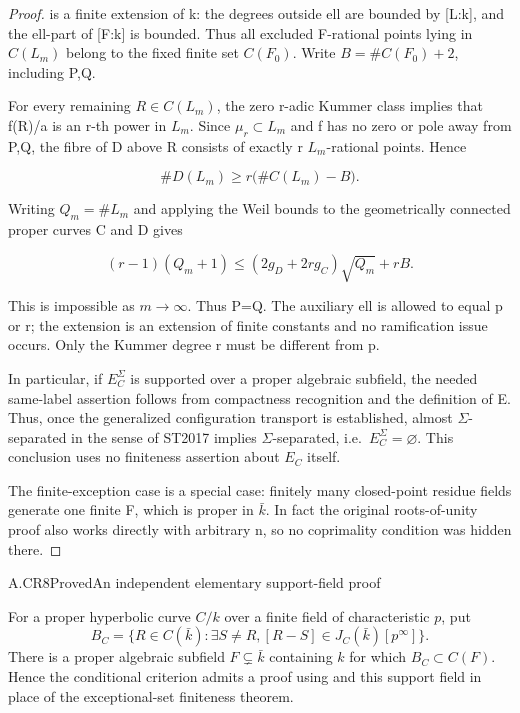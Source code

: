 \begin{proof}
is a finite extension of k: the degrees outside ell are bounded by {[}L:k{]}, and the ell-part of {[}F:k{]} is bounded. Thus all excluded F-rational points lying in \(C(L_m)\) belong to the fixed finite set \(C(F_0)\). Write \(B=\#C(F_0)+2\), including P,Q.

For every remaining \(R{\in}C(L_m)\), the zero r-adic Kummer class implies that f(R)/a is an r-th power in \(L_m\). Since \({\mu}_r{\subset}L_m\) and f has no zero or pole away from P,Q, the fibre of D above R consists of exactly r \(L_m\)-rational points. Hence

\[\#D(L_m)\ge r\bigl(\#C(L_m)-B\bigr).\]

Writing \(Q_m=\#L_m\) and applying the Weil bounds to the geometrically connected proper curves C and D gives

\[(r-1)(Q_m+1)\le (2g_D+2r g_C)\sqrt{Q_m}+rB.\]

This is impossible as \(m{\to}{\infty}\). Thus P=Q. The auxiliary ell is allowed to equal p or r; the extension is an extension of finite constants and no ramification issue occurs. Only the Kummer degree r must be different from p.

In particular, if \(E_C^{\Sigma}\) is supported over a proper algebraic subfield, the needed same-label assertion follows from compactness recognition and the definition of E. Thus, once the generalized configuration transport is established, almost \({\Sigma}\)-separated in the sense of ST2017 implies \({\Sigma}\)-separated, i.e.~\(E_C^{\Sigma}=\varnothing\). This conclusion uses no finiteness assertion about \(E_C\) itself.

The finite-exception case is a special case: finitely many closed-point residue fields generate one finite F, which is proper in \(\bar k\). In fact the original roots-of-unity proof also works directly with arbitrary n, so no coprimality condition was hidden there.


\end{proof}

\begin{claim}{A.CR8}{Proved}{An independent elementary support-field proof}

For a proper hyperbolic curve $C/k$ over a finite field of
characteristic $p$, put
\[
B_C=\{R\in C(\bar k):\exists S\ne R,
       [R-S]\in J_C(\bar k)[p^\infty]\}.
\]
There is a proper algebraic subfield $F\subsetneq\bar k$ containing
$k$ for which $B_C\subset C(F)$. Hence the conditional criterion
 admits a proof using
 and this support field in place of the
exceptional-set finiteness theorem.

\end{claim}

